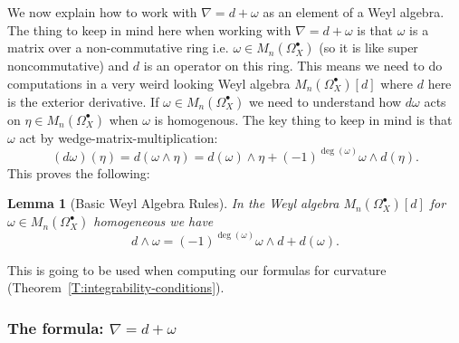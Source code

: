 \documentclass[12pt]{book}
\numberwithin{equation}{section}
\newtheorem{lemma}[theorem]{Lemma}
\theoremstyle{definition}
\theoremstyle{remark}
\begin{document}
We now explain how to work with $\nabla=d+\omega$ as an element of a Weyl algebra.
The thing to keep in mind here when working with $\nabla =d+\omega$ is that $\omega$ is a matrix over a non-commutative ring i.e. $\omega \in M_n(\Omega_X^{\bullet})$ (so it is like super noncommutative) and $d$ is an operator on this ring. 
This means we need to do computations in a very weird looking Weyl algebra $M_n(\Omega_X^{\bullet})[d]$ where $d$ here is the exterior derivative. 
If $\omega \in M_n(\Omega_X^{\bullet})$ we need to understand how $d\omega$ acts on $\eta\in M_n(\Omega_X^{\bullet})$ when $\omega$ is homogenous. 
The key thing to keep in mind is that  $\omega$ act by wedge-matrix-multiplication:
$$(d\omega)(\eta) = d(\omega\wedge \eta) = d(\omega) \wedge \eta + (-1)^{\deg(\omega)} \omega \wedge d(\eta).$$
This proves the following:
\begin{lemma}[Basic Weyl Algebra Rules]\label{L:exterior-weyl-algebra}
In the Weyl algebra	$M_n(\Omega_X^{\bullet})[d]$ for $\omega \in M_n(\Omega_X^{\bullet})$ homogeneous we have 
	\begin{equation}
	d \wedge \omega = (-1)^{\deg(\omega)} \omega \wedge d + d(\omega).
	\end{equation}
\end{lemma}
This is going to be used when computing our formulas for curvature (Theorem~\ref{T:integrability-conditions}).

\subsubsection{The formula: $\nabla = d +\omega$}
\end{document}

